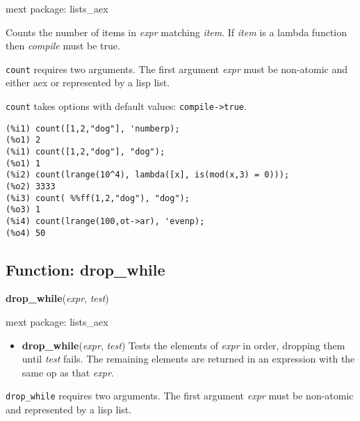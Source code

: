 \documentclass[]{article}
\begin{document}
\noindent mext package: lists\_aex



\vspace{5 pt}
Counts the number of items in {\it expr} matching {\it item}. If {\it item} is a lambda function then {\it compile} must be true. 

\vspace{5 pt}

   {\tt count} requires two arguments.
    The first argument {\it expr} must be non-atomic and either aex or represented by a lisp list.


\vspace{5 pt}

{\tt count} takes options with default values: {\tt compile->true}.
\vspace{5 pt}


\begin{Verbatim}[frame=single]
(%i1) count([1,2,"dog"], 'numberp);
(%o1) 2
(%i1) count([1,2,"dog"], "dog");
(%o1) 1
(%i2) count(lrange(10^4), lambda([x], is(mod(x,3) = 0)));
(%o2) 3333
(%i3) count( %%ff(1,2,"dog"), "dog");
(%o3) 1
(%i4) count(lrange(100,ot->ar), 'evenp);
(%o4) 50
\end{Verbatim}


\subsection{Function: drop\_while\label{sec:drop_while}}
\hypertarget{drop_while}{}
{\bf drop\_while}({\it expr}, {\it test})


\noindent mext package: lists\_aex



\vspace{5 pt}
\begin{itemize}
\item[] {\bf drop\_while}({\it expr}, {\it test})
  Tests the elements of {\it expr} in order, dropping them until {\it test} fails. The remaining elements are returned in an expression with the same op as that {\it expr}. 

\end{itemize}
   {\tt drop\_while} requires two arguments.
    The first argument {\it expr} must be non-atomic and represented by a lisp list.


\vspace{5 pt}
\end{document}
